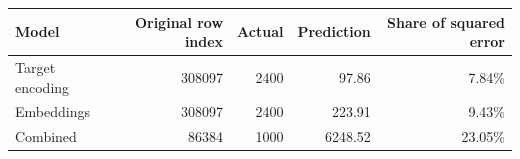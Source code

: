 \begin{center}\small
\begin{tabular}{lrrrr}
\toprule
Model & Original row index & Actual & Prediction & Share of squared error \\
\midrule
Target encoding & 308097 & 2400 & 97.86 & 7.84\% \\
Embeddings & 308097 & 2400 & 223.91 & 9.43\% \\
Combined & 86384 & 1000 & 6248.52 & 23.05\% \\
\bottomrule
\end{tabular}\end{center}
